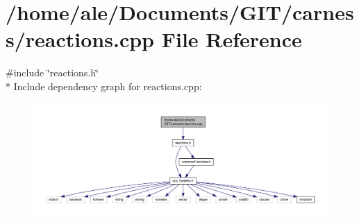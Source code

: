 \hypertarget{a00086}{\section{/home/ale/\-Documents/\-G\-I\-T/carness/reactions.cpp File Reference}
\label{a00086}
}
{\ttfamily \#include \char`\"{}reactions.\-h\char`\"{}}\\*
Include dependency graph for reactions.\-cpp\-:\nopagebreak
\begin{figure}[H]
\begin{center}
\leavevmode
\includegraphics[width=350pt]{a00135}
\end{center}
\end{figure}
